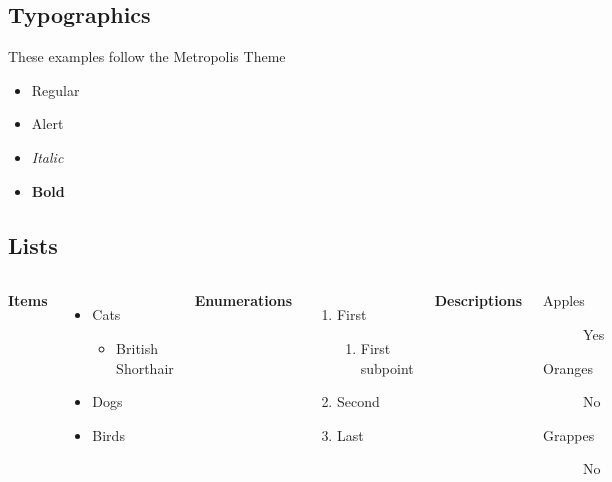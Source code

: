 \documentclass[
11pt,notheorems,hyperref={pdfauthor=whatever}
]{beamer}
\begin{document}
\subsection{Typographics}
\begin{frame}
    These examples follow the Metropolis Theme
    \begin{itemize}
        \item Regular
        \item \alert{Alert}
        \item \textit{Italic}
        \item \textbf{Bold}
    \end{itemize}
\end{frame}

\subsection{Lists}

\begin{frame}
    \begin{columns}[T,onlytextwidth]
      \textbf{Items}
      \begin{itemize}
        \item Cats 
        \begin{itemize}
            \item British Shorthair
        \end{itemize}
        \item Dogs \item Birds
      \end{itemize}

      \textbf{Enumerations}
      \begin{enumerate}
        \item First 
        \begin{enumerate}
            \item First subpoint
        \end{enumerate}
        \item Second \item Last
      \end{enumerate}

      \textbf{Descriptions}
      \begin{description}
        \item[Apples] Yes \item[Oranges] No \item[Grappes] No
      \end{description}
\end{columns}
\end{frame}
\end{document}
